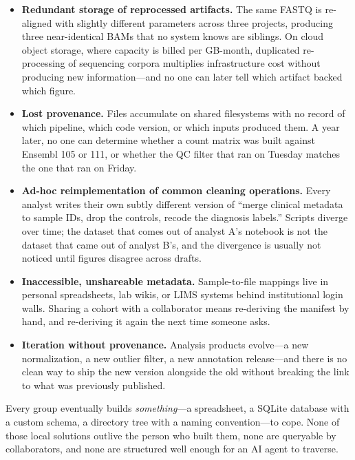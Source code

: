 \documentclass[sigconf, nonacm]{acmart}
\begin{document}
\begin{itemize}
\item \textbf{Redundant storage of reprocessed artifacts.} The same FASTQ is re-aligned with slightly different parameters across three projects, producing three near-identical BAMs that no system knows are siblings. On cloud object storage, where capacity is billed per GB-month, duplicated re-processing of sequencing corpora multiplies infrastructure cost without producing new information---and no one can later tell which artifact backed which figure.
\item \textbf{Lost provenance.} Files accumulate on shared filesystems with no record of which pipeline, which code version, or which inputs produced them. A year later, no one can determine whether a count matrix was built against Ensembl 105 or 111, or whether the QC filter that ran on Tuesday matches the one that ran on Friday.
\item \textbf{Ad-hoc reimplementation of common cleaning operations.} Every analyst writes their own subtly different version of ``merge clinical metadata to sample IDs, drop the controls, recode the diagnosis labels.'' Scripts diverge over time; the dataset that comes out of analyst A's notebook is not the dataset that came out of analyst B's, and the divergence is usually not noticed until figures disagree across drafts.
\item \textbf{Inaccessible, unshareable metadata.} Sample-to-file mappings live in personal spreadsheets, lab wikis, or LIMS systems behind institutional login walls. Sharing a cohort with a collaborator means re-deriving the manifest by hand, and re-deriving it again the next time someone asks.
\item \textbf{Iteration without provenance.} Analysis products evolve---a new normalization, a new outlier filter, a new annotation release---and there is no clean way to ship the new version alongside the old without breaking the link to what was previously published.
\end{itemize}

Every group eventually builds \emph{something}---a spreadsheet, a SQLite database with a custom schema, a directory tree with a naming convention---to cope. None of those local solutions outlive the person who built them, none are queryable by collaborators, and none are structured well enough for an AI agent to traverse.
\end{document}
